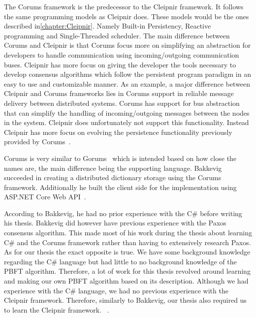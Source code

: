 The Corums framework is the predecessor to the Cleipnir framework. It follows the same programming models as Cleipnir does. These models would be the ones described in\autoref{chapter:Cleipnir}. Namely Built-in Persistency, Reactive programming and Single-Threaded scheduler.
The main difference between Corums and Cleipnir is that Corums focus more on simplifying an abstraction for developers to handle communication using incoming/outgoing communication buses. Cleipnir has more focus on giving the developer the tools necessary to develop consensus algorithms which follow the persistent program paradigm in an easy to use and customizable manner. As an example, a major difference between Cleipnir and Corums frameworks lies in Corums support in reliable message delivery between distributed systems. Corums has support for bus abstraction that can simplify the handling of incoming/outgoing messages between the nodes in the system. Cleipnir does unfortunately not support this functionality. Instead Cleipnir has more focus on evolving the persistence functionality previously provided by Corums~\cites[p.~6-7]{PAPER:PaxosCleipnir}{DOC:Cleipnir}.
 
Corums is very similar to Gorums~\cites[p.~2]{WEB:Gorums}[p.~22]{PAPER:EivindPaper} which is intended based on how close the names are, the main difference being the supporting language.
Bakkevig succeeded in creating a distributed dictionary storage using the Corums framework. Additionally he built the client side for the implementation using ASP.NET Core Web API~\cite{WEB:ASPNetCoreAPI}.
 
According to Bakkevig, he had no prior experience with the C\# before writing his thesis. Bakkevig did however have previous experience with the Paxos consensus algorithm. This made most of his work during the thesis about learning C\# and the Corums framework rather than having to extensively research Paxos. As for our thesis the exact opposite is true. We have some background knowledge regarding the C\# language but had little to no background knowledge of the PBFT algorithm. Therefore, a lot of work for this thesis revolved around learning and making our own PBFT algorithm based on its description. Although we had experience with the C\# language, we had no previous experience with the Cleipnir framework. Therefore, similarly to Bakkevig, our thesis also required us to learn the Cleipnir framework. ~\cite[p.~8]{PAPER:EivindPaper}.

